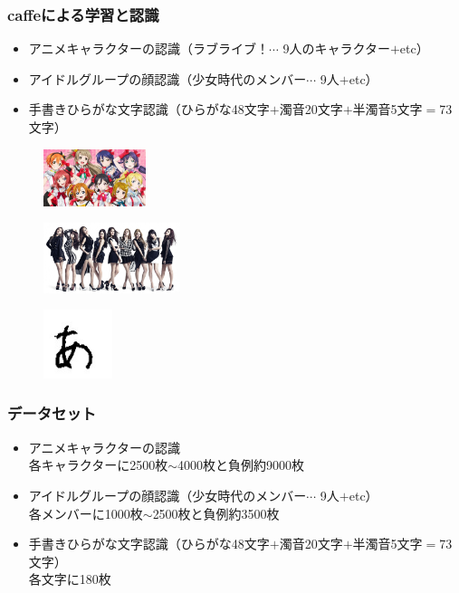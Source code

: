 \documentclass[dvipdfmx,11pt,notheorems]{beamer}
\theoremstyle{definition}
\begin{document}
\begin{frame}\frametitle{caffeによる学習と認識}
\begin{itemize}
\item アニメキャラクターの認識（ラブライブ！$\cdots$ 9人のキャラクター$+$etc）
\item アイドルグループの顔認識（少女時代のメンバー$\cdots$ 9人$+$etc）
\item 手書きひらがな文字認識（ひらがな48文字$+$濁音20文字$+$半濁音5文字$=$73文字）
\end{itemize}
\begin{figure}[t]
 \begin{minipage}{0.3\hsize}
  \centering
  \includegraphics[width=30mm]{./fig/jpg/lovelive.jpg} \\
 \end{minipage}
 \begin{minipage}{0.3\hsize}
  \centering
  \includegraphics[width=40mm]{./fig/jpg/snsd.jpg}\\
 \end{minipage}
 \begin{minipage}{0.3\hsize}
  \centering
  \includegraphics[width=20mm]{./fig/jpg/a.jpg}\\
 \end{minipage}
\end{figure}
\end{frame}

\begin{frame}\frametitle{データセット}
\begin{itemize}
\item アニメキャラクターの認識\\
	  各キャラクターに2500枚$\sim$4000枚と負例約9000枚
\item アイドルグループの顔認識（少女時代のメンバー$\cdots$ 9人$+$etc）\\
    各メンバーに1000枚$\sim$2500枚と負例約3500枚
\item 手書きひらがな文字認識（ひらがな48文字$+$濁音20文字$+$半濁音5文字$=$73文字）\\
    各文字に180枚
\end{itemize}
\end{frame}
\end{document}
